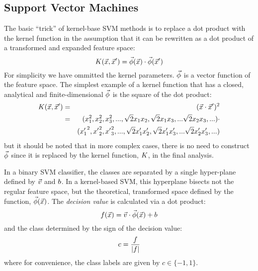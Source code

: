 \documentclass{article}
\begin{document}
\subsection{Support Vector Machines}

The basic ``trick'' of kernel-base SVM methods is to replace a dot product
with the kernel function in the assumption that it can be rewritten
as a dot product of a transformed and expanded feature space:
\begin{equation}
	K(\vec {x}, \vec {x}^\prime) = \vec\phi(\vec {x}) \cdot \vec\phi(\vec {x}^\prime)
\end{equation}
For simplicity we have ommitted the kernel parameters.
$\vec\phi$ is a vector function of the feature space.
The simplest example of a kernel function that has a closed, analytical and
finite-dimensional $\vec\phi$ is the square of the dot product:
\begin{eqnarray}
	K(\vec {x}, \vec {x}^\prime) & = & (\vec {x} \cdot \vec {x}^\prime)^2 \\ \nonumber
					 & = & (x_1^2, x_2^2, x_3^2, ..., \sqrt{2} x_1 x_2, \sqrt{2} x_1 x_3, ... \sqrt{2} x_2 x_3, ...) \cdot \\ \nonumber
      & &	 ({x^\prime_1}^2, {x^\prime}_2^2, {x^\prime}_3^2, ..., \sqrt{2} x^\prime_1 x^\prime_2, \sqrt{2} x^\prime_1 x^\prime_3, ... \sqrt{2} x^\prime_2 x^\prime_3, ...) 
\end{eqnarray}
but it should be noted that in more complex cases, 
there is no need to construct $\vec\phi$ since it is replaced by the 
kernel function, $K$, in the final analysis.

In a binary SVM classifier, the classes are separated by a single hyper-plane
defined by $\vec v$ and $b$.
In a kernel-based SVM, this hyperplane bisects not the regular feature
space, but the theoretical, transformed space defined by the function,
$\vec\phi(\vec {x})$.
The {\it decision value} is calculated via a dot product:
\begin{equation}
	f(\vec {x})=\vec v \cdot \vec\phi(\vec {x}) + b
	\label{decision_function0}
\end{equation}
and the class determined by the sign of the decision value:
\begin{equation}
	c=\frac{f}{|f|}
	\label{class_value}
\end{equation}
where for convenience, the class labels are given by $c \in \lbrace -1, 1 \rbrace$.
\end{document}
